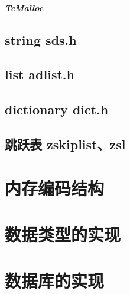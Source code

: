 \documentclass[UTF8,a4paper,12pt]{ctexbook}
\begin{document}
			\subparagraph{TcMalloc}
			
		\subsection{string sds.h}
			
		\subsection{list adlist.h}
			
		\subsection{dictionary dict.h}
		
		\subsection{跳跃表  zskiplist、zsl}	
	
	\section{内存编码结构}
	
	
	\section{数据类型的实现}
	
	
	\section{数据库的实现}
	
    
	
\end{document}
